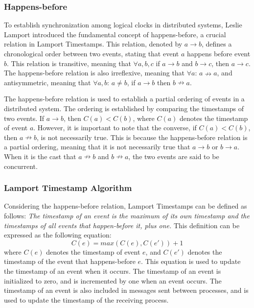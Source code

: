 \documentclass{article}
\begin{document}
  \subsubsection{Happens-before}
    To establish synchronization among logical clocks in distributed systems, Leslie Lamport introduced the fundamental concept of happens-before, a crucial relation in Lamport Timestamps. This relation, denoted by $a \rightarrow b$, defines a chronological order between two events, stating that event $a$ happens before event $b$. This relation is transitive, meaning that \(\forall a,b,c\) if $a \rightarrow b$ and $b \rightarrow c$, then $a \rightarrow c$. The happens-before relation is also irreflexive, meaning that \(\forall a\): $a \nrightarrow a$, and antisymmetric, meaning that \(\forall a,b\): $a \neq b$, if \(a \rightarrow b\) then $b \nrightarrow a$.

    The happens-before relation is used to establish a partial ordering of events in a distributed system. The ordering is established by comparing the timestamps of two events. If $a \rightarrow b$, then $C(a) < C(b)$, where $C(a)$ denotes the timestamp of event $a$. However, it is important to note that the converse, if $C(a) < C(b)$, then $a \nrightarrow b$, is not necessarily true. This is because the happens-before relation is a partial ordering, meaning that it is not necessarily true that $a \rightarrow b$ or $b \rightarrow a$. When it is the cast that $a \nrightarrow b$ and $b \nrightarrow a$, the two events are said to be concurrent.

  \subsubsection{Lamport Timestamp Algorithm}\label{sec:lamport_timestamp_algorithm}
    Considering the happens-before relation, Lamport Timestamps can be defined as follows: \textit{The timestamp of an event is the maximum of its own timestamp and the timestamps of all events that happen-before it, plus one.} This definition can be expressed as the following equation:
    \begin{equation}
      C(e) = max(C(e), C(e')) + 1
    \end{equation}
    where $C(e)$ denotes the timestamp of event $e$, and $C(e')$ denotes the timestamp of the event that happens-before $e$. This equation is used to update the timestamp of an event when it occurs. The timestamp of an event is initialized to zero, and is incremented by one when an event occurs. The timestamp of an event is also included in messages sent between processes, and is used to update the timestamp of the receiving process.
\end{document}
